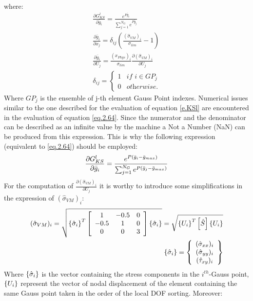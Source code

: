 where:
\begin{eqnarray}
\label{eq.2.64}
\frac{\partial G_{KS}^l}{\partial \bar{g}_i}=\frac{e^{P\bar{g}_i}}{\sum_{j=1}^{N_G}e^{P\bar{g}_j}} \\
\frac{\partial  \bar{g}_i}{\partial x_j}=\delta_{ij} \left(\frac{(\hat{\sigma}_{VM})_i}{\sigma_{lim}}-1\right)\\
\frac{\partial  \bar{g}_i}{\partial U_j}=\frac{(x_{Phys})_i}{\sigma_{lim}}\frac{\partial (\hat{\sigma}_{VM})_i} {\partial U_j}\\
\delta_{ij}=\begin{cases}
1 & \textit{if } i\in GP_j \\
0 & \textit{otherwise.}
\end{cases}
\end{eqnarray} 
Where $GP_j$ is the ensemble of j-th element Gauss Point indexes. Numerical issues similar to the one described for the evaluation of equation \eqref{e.KSl} are encountered in the evaluation of equation \eqref{eq.2.64}. Since the numerator and the denominator can be described as an infinite value by the machine a Not a Number (NaN) can be produced from this expression. This is why the following expression (equivalent to \eqref{eq.2.64}) should be employed:
\begin{equation}
\frac{\partial G_{KS}^l}{\partial \bar{g}_i}=\frac{e^{P\left(\bar{g}_i-\bar{g}_{max}\right)}}{\sum_{j=1}^{N_G}e^{P\left(\bar{g}_j-\bar{g}_{max}\right)}} \\
\end{equation}
 For the computation of $\frac{\partial (\hat{\sigma}_{VM})_i} {\partial U_j}$ it is worthy to introduce some simplifications in the expression of $(\hat{\sigma}_{VM})_i$:
\begin{eqnarray}
(\hat{\sigma}_{VM})_i=\sqrt{\left\lbrace{\hat{\sigma}_i}\right \rbrace^T \left[{\begin{array}{ccc}
1 & -0.5 & 0\\
-0.5 & 1 & 0\\
0 & 0 & 3
\end{array}}\right]\left\lbrace{\hat{\sigma}_i}\right \rbrace}=\sqrt{\left\lbrace{U_i}\right \rbrace^T \left[{\hat{S}}\right]\left\lbrace{U_i}\right \rbrace}\\
\left\lbrace{\hat{\sigma}_i}\right \rbrace=\left\lbrace{\begin{array}{c}
(\hat{\sigma}_{xx})_i\\
(\hat{\sigma}_{yy})_i\\
(\hat{\tau}_{xy})_i
\end{array}}\right \rbrace
\end{eqnarray}
Where $\left\lbrace{\hat{\sigma}_i}\right \rbrace$ is the vector containing the stress components in the $i^{th}$-Gauss point, $\left\lbrace{U_i}\right \rbrace$ represent the vector of nodal displacement of the element containing the same Gauss point taken in the order of the local DOF sorting. Moreover:
